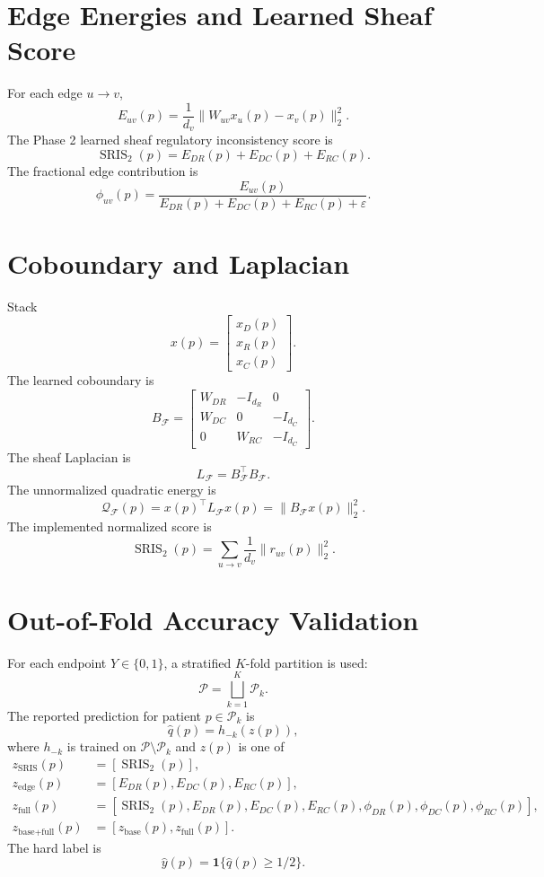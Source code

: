 \documentclass[11pt]{article}
\newcommand{\F}{\mathcal{F}}
\newcommand{\SRIS}{\operatorname{SRIS}}
\begin{document}
\section{Edge Energies and Learned Sheaf Score}

For each edge $u\to v$,
\[
E_{uv}(p)=\frac{1}{d_v}\|W_{uv}x_u(p)-x_v(p)\|_2^2.
\]
The Phase 2 learned sheaf regulatory inconsistency score is
\[
\SRIS_2(p)=E_{DR}(p)+E_{DC}(p)+E_{RC}(p).
\]
The fractional edge contribution is
\[
\phi_{uv}(p)=\frac{E_{uv}(p)}{E_{DR}(p)+E_{DC}(p)+E_{RC}(p)+\varepsilon}.
\]

\section{Coboundary and Laplacian}

Stack
\[
x(p)=\begin{bmatrix}x_D(p)\\x_R(p)\\x_C(p)\end{bmatrix}.
\]
The learned coboundary is
\[
B_{\F}=\begin{bmatrix}
W_{DR} & -I_{d_R} & 0\\
W_{DC} & 0 & -I_{d_C}\\
0 & W_{RC} & -I_{d_C}
\end{bmatrix}.
\]
The sheaf Laplacian is
\[
L_{\F}=B_{\F}^{\top}B_{\F}.
\]
The unnormalized quadratic energy is
\[
\mathcal Q_{\F}(p)=x(p)^{\top}L_{\F}x(p)=\|B_{\F}x(p)\|_2^2.
\]
The implemented normalized score is
\[
\SRIS_2(p)=\sum_{u\to v}\frac{1}{d_v}\|r_{uv}(p)\|_2^2.
\]

\section{Out-of-Fold Accuracy Validation}

For each endpoint $Y\in\{0,1\}$, a stratified $K$-fold partition is used:
\[
\mathcal P=\bigsqcup_{k=1}^{K}\mathcal P_k.
\]
The reported prediction for patient $p\in\mathcal P_k$ is
\[
\widehat q(p)=h_{-k}(z(p)),
\]
where $h_{-k}$ is trained on $\mathcal P\setminus\mathcal P_k$ and $z(p)$ is one of
\[
\begin{aligned}
z_{\text{SRIS}}(p)&=[\SRIS_2(p)],\\
z_{\text{edge}}(p)&=[E_{DR}(p),E_{DC}(p),E_{RC}(p)],\\
z_{\text{full}}(p)&=[\SRIS_2(p),E_{DR}(p),E_{DC}(p),E_{RC}(p),\phi_{DR}(p),\phi_{DC}(p),\phi_{RC}(p)],\\
z_{\text{base}+\text{full}}(p)&=[z_{\text{base}}(p),z_{\text{full}}(p)].
\end{aligned}
\]
The hard label is
\[
\widehat y(p)=\mathbf 1\{\widehat q(p)\ge 1/2\}.
\]
\end{document}
